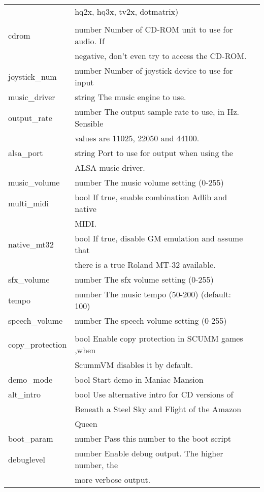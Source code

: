 \begin{tabular}[hf]{lll}
                       &         hq2x, hq3x, tv2x, dotmatrix)\\
\\
        cdrom           &number   Number of CD-ROM unit to use for audio. If\\
                        &         negative, don't even try to access the CD-ROM.\\
        joystick\_num   &number   Number of joystick device to use for input\\
        music\_driver   &string   The music engine to use.\\
        output\_rate    &number   The output sample rate to use, in Hz. Sensible\\
                        &         values are 11025, 22050 and 44100.\\
        alsa\_port      &string   Port to use for output when using the\\
                        &         ALSA music driver.\\
        music\_volume   &number   The music volume setting (0-255)\\
        multi\_midi     &bool     If true, enable combination Adlib and native\\
                        &         MIDI.\\
        native\_mt32    &bool     If true, disable GM emulation and assume that\\
                        &         there is a true Roland MT-32 available.\\
        sfx\_volume     &number   The sfx volume setting (0-255)\\
        tempo           &number   The music tempo (50-200) (default: 100)\\
        speech\_volume  &number   The speech volume setting (0-255)\\
\\
        copy\_protection&bool     Enable copy protection in SCUMM games ,when\\
                        &         ScummVM disables it by default.\\
        demo\_mode      &bool     Start demo in Maniac Mansion\\
        alt\_intro      &bool     Use alternative intro for CD versions of \\
                        &         Beneath a Steel Sky and Flight of the Amazon\\
                        &         Queen
\\
        boot\_param     &number   Pass this number to the boot script\\
        debuglevel      &number   Enable debug output. The higher number, the\\
                        &         more verbose output.\\
\end{tabular}

